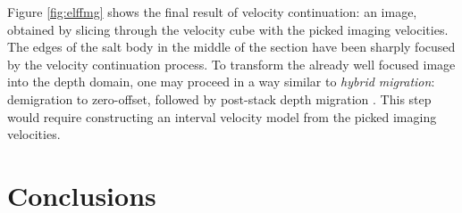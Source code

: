 



Figure \ref{fig:elffmg} shows the final result of velocity
continuation: an image, obtained by slicing through the velocity cube
with the picked imaging velocities. The edges of the salt body in the middle
of the section have been sharply focused by the velocity
continuation process. To transform the already well focused image into the
depth domain, one may proceed in a way similar to
\emph{hybrid migration}: demigration to zero-offset, followed by
post-stack depth migration \cite{GEO62-02-05680576}. This step
would require constructing an interval velocity model from the picked imaging
velocities.


\begin{comment}
Without repeating the details of the procedure, Figures~\ref{fig:pck}
and \ref{fig:img} show picked imaging velocities and the velocity
continuation image for the Blake Outer Ridge data, shown in many other
papers in this report.

\plot{pck}{width=6in,height=3.5in}{Blake Outer Ridge data. Automatic
  picks of 2-D imaging velocity after velocity continuation. The contour
  spacing is 0.01 km/s, starting from 1.5 km/s.}

\plot{img}{angle=90,totalheight=8.5in,width=6in}{Blake Outer Ridge
  data. Final result of velocity continuation: seismic image, obtained
  by slicing through the velocity cube.}
\end{comment}

\section{Conclusions}

